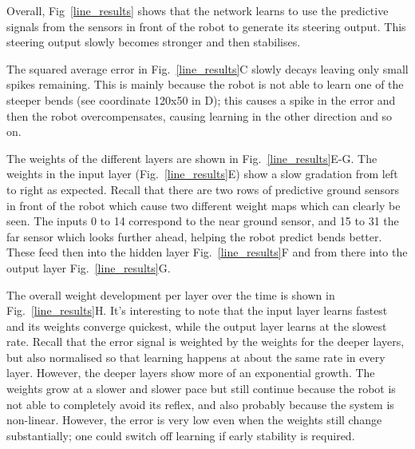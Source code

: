 \documentclass{llncs}
\begin{document}
Overall, Fig~\ref{line_results} shows that the network learns to use
the predictive signals from the sensors in front of the robot to
generate its steering output. This steering output slowly becomes
stronger and then stabilises.

The squared average error in Fig.~\ref{line_results}C slowly decays
leaving only small spikes remaining. This is mainly because
the robot is not able to learn one of the steeper bends (see
coordinate 120x50 in D); this causes a spike in the error and
then the robot overcompensates, causing learning in the
other direction and so on.

The weights of the different layers are shown in
Fig.~\ref{line_results}E-G.  The weights in the input layer
(Fig.~\ref{line_results}E) show a slow gradation  from left to right as
expected. Recall that there are two rows of predictive ground
sensors in front of the robot which cause two different weight maps
which can clearly be seen. The inputs 0 to 14 correspond to the near
ground sensor, and 15 to 31 the far sensor which looks further ahead, 
helping the robot predict bends better. These feed then into the 
hidden layer Fig.~\ref{line_results}F
and from there into the output layer Fig.~\ref{line_results}G.

The overall weight development per layer over the time 
is shown in Fig.~\ref{line_results}H. It's interesting to note
that the input layer learns fastest and its weights converge
quickest, while the output layer learns at the slowest rate. Recall 
that the error signal is weighted by the weights for the deeper
layers, but also normalised so that learning happens at about the
same rate in every layer. However, the deeper layers show more
of an exponential growth. The weights grow at a slower
and slower pace but still continue because the robot is not able to completely
avoid its reflex, and also probably because the system is non-linear.
However, the error is very low even when the weights still change
substantially; one could switch off learning if early stability
is required.
\end{document}
